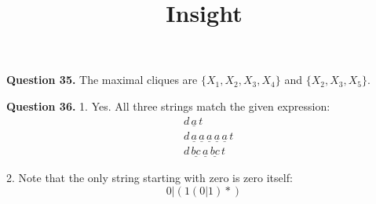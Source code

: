 \documentclass{ximera}
\title{Insight}
\begin{document}
\maketitle

\textbf{Question 35. } The maximal cliques are $\{X_1, X_2, X_3, X_4\}$ and $\{X_2, X_3, X_5\}$.

\textbf{Question 36. }
1. Yes. All three strings match the given expression:
\begin{align*}
&d \, \underline{a} \, t\\
&d \, \underline{a} \, \underline{a} \, \underline{a} \, \underline{a} \, \underline{a} \, t\\
&d \, \underline{bc} \, \underline{a} \, \underline{bc} \, t
\end{align*}

2. Note that the only string starting with zero is zero itself:
\begin{equation*}
0 | \left(1(0|1)*\right)
\end{equation*}
\end{document}
